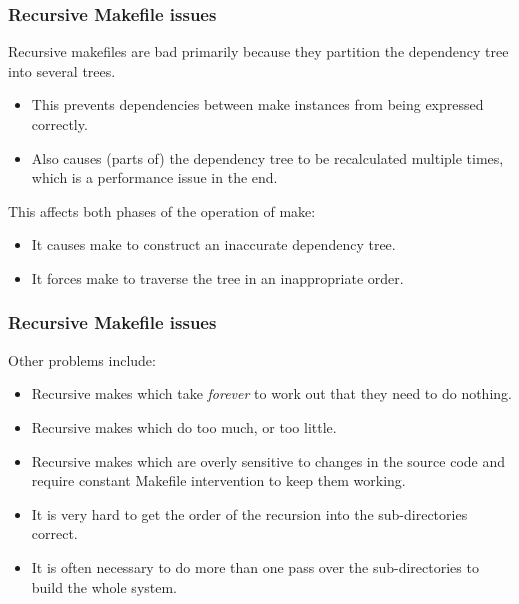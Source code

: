 \documentclass[11pt]{beamer}
\begin{document}
\begin{frame}[label=issues]
  \frametitle{Recursive Makefile issues}
  Recursive makefiles are bad primarily because they partition the dependency
  tree into several trees.

  \begin{itemize}
    \item This prevents dependencies between make instances from being
      expressed correctly.\\[2mm]
    \item Also causes (parts of) the dependency tree to be recalculated
      multiple times, which is a performance issue in the end.
  \end{itemize}

  \vspace{5mm}
  This affects both phases of the operation of make:

  \begin{itemize}
    \item It causes make to construct an inaccurate dependency tree.\\[2mm]
    \item It forces make to traverse the tree in an inappropriate order.
  \end{itemize}

  \vspace{3mm}
  \hyperlink{tree-problem}{}
\end{frame}


\begin{frame}
  \frametitle{Recursive Makefile issues}
  Other problems include:

  \begin{itemize}
    \item Recursive makes which take \emph{forever} to work out that they need
      to do nothing.\\[2mm]
    \item Recursive makes which do too much, or too little.\\[2mm]
    \item Recursive makes which are overly sensitive to changes in the source
      code and require constant Makefile intervention to keep them
      working.\\[2mm]
    \item It is very hard to get the order of the recursion into the
      sub-directories correct.\\[2mm]
    \item It is often necessary to do more than one pass over the
      sub-directories to build the whole system.
  \end{itemize}
\end{frame}
\end{document}
